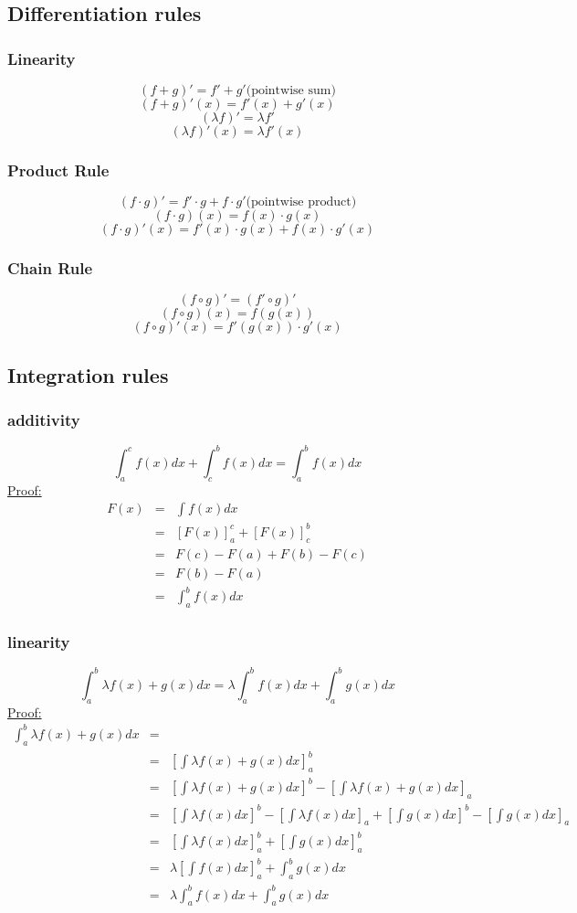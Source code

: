 \documentclass[a4paper, 12pt]{article}
\begin{document}
\subsection{Differentiation rules}
\subsubsection{Linearity} $$(f+g)' = f' + g' \text{(pointwise sum)}$$ $$(f+g)'(x) = f'(x) +g'(x)$$ $$(\lambda f)' = \lambda f'$$ $$(\lambda f)'(x) = \lambda f'(x)$$
\subsubsection{Product Rule} $$(f\cdot g)' = f' \cdot g + f \cdot g' \text{(pointwise product)}$$ $$ (f \cdot g)(x) = f(x)\cdot g(x)$$ $$(f\cdot g)'(x) = f'(x) \cdot g(x) + f(x) \cdot g'(x)$$
\subsubsection{Chain Rule} $$(f \circ g)' = (f' \circ g)'$$ $$(f \circ g)(x) = f(g(x))$$ $$(f \circ g)'(x) = f'(g(x))\cdot g'(x)$$
\subsection{Integration rules} 
\subsubsection{additivity} $$\int_{a}^{c} f(x) dx + \int_{c}^{b} f(x) dx  = \int_{a}^{b} f(x) dx$$ \underline{Proof:} 
\begin{eqnarray*}
 F(x) &=& \int f(x) dx\\
 &=& [F(x)]^c_a + [F(x)]^b_c\\
 &=& F(c) - F(a) +F(b) - F(c)\\
 &=& F(b) - F(a)\\
 &=& \int_{a}^{b} f(x) dx
 \end{eqnarray*}
\subsubsection{linearity} $$\int_{a}^{b} \lambda f(x) + g(x) dx = \lambda \int_{a}^{b} f(x) dx + \int_{a}^{b} g(x) dx$$ \underline{Proof:} 
\begin{eqnarray*}
\int_{a}^{b} \lambda f(x) + g(x) dx &=& \\
&=& [\int \lambda f(x) + g(x) dx]_{a}^{b}\\
&=& [\int \lambda f(x) + g(x) dx]^{b} - [\int \lambda f(x) + g(x) dx]_{a}\\
&=& [\int \lambda f(x) dx]^{b} - [\int \lambda f(x) dx]_{a} + [\int g(x) dx]^{b} - [\int g(x) dx]_{a}\\
&=& [\int \lambda f(x) dx]^{b}_{a} + [\int g(x) dx]^{b}_{a}\\
&=& \lambda[\int f(x) dx]^{b}_{a} + \int^{b}_{a} g(x) dx\\
&=& \lambda \int_{a}^{b} f(x) dx + \int_{a}^{b} g(x) dx
\end{eqnarray*}
\end{document}

